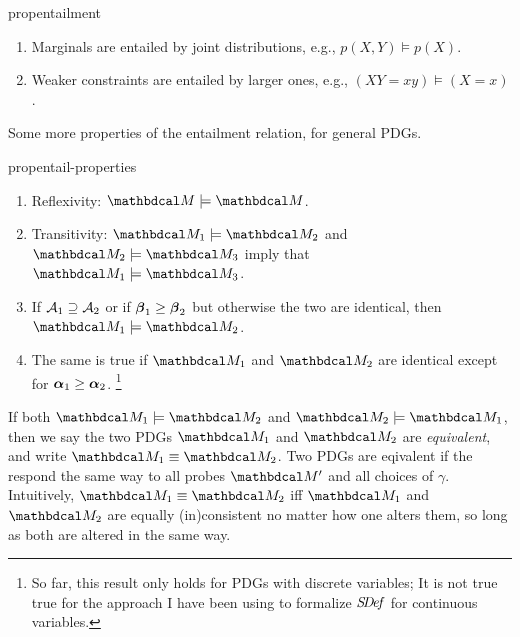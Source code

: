     
    \begin{linked}{prop}{entailment}
    \begin{enumerate}[parsep=0pt,itemsep=0.2ex]
        \item Marginals are entailed by joint distributions, e.g., $p(X,Y) \models p(X)$.
        \item Weaker constraints are entailed by larger ones, e.g., $(XY {=}xy) \models (X{=}x)$. 
    \end{enumerate}   
    \end{linked}
    
    Some more properties of the entailment relation, for general PDGs.
    
    \begin{linked}{prop}{entail-properties}
        \begin{enumerate}[parsep=0pt]
            \item Reflexivity: $\dg M \models \dg M$.
            \item Transitivity: $\dg M_1 \models \dg M_2$ and $\dg M_2 \models \dg M_3$ imply that $\dg M_1 \models \dg M_3$. 
            \item If 
                $\mathcal A_1 \supseteq \mathcal A_2$
                 or if $\boldsymbol\beta_1 \ge \boldsymbol\beta_2$ but otherwise the two are identical, then $\dg M_1 \models \dg M_2$. 
            \item The same is true if $\dg M_1$ and $\dg M_2$ are identical except for
            $\boldsymbol\alpha_1 \ge \boldsymbol\alpha_2$.%
                \footnote{
                So far, this result only holds for PDGs with discrete variables;
                It is not true true for the approach I have been using to
                formalize $\mathit{S\mskip-3.5muD\mskip-2.5mue\mskip-1.5muf}$ for continuous variables.
                }
        \end{enumerate}
    \end{linked}
    
    
    If both $\dg M_1 \models \dg M_2$ and $\dg M_2 \models \dg M_1$, 
        then we say the two PDGs $\dg M_1$ and $\dg M_2$ are \emph{equivalent}, and write $\dg M_1 \equiv \dg M_2$.
    Two PDGs are eqivalent if the respond the same way to all probes $\dg M'$ and all choices of $\gamma$.
    Intuitively, $\dg M_1 \equiv \dg M_2$ iff $\dg M_1$ and $\dg M_2$ are equally (in)consistent no matter how one alters them, so long as both are altered in the same way. 
    
